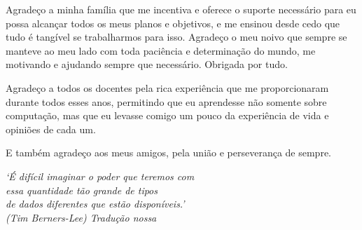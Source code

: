 \documentclass[
	12pt,				%
	openright,			%
	twoside,			%
	a4paper,			%
	english,			%
	french,				%
	spanish,			%
	brazil				%
	]{abntex2}
\begin{document}
\begin{agradecimentos}
 Agradeço a minha família que me incentiva e oferece o suporte necessário para eu possa alcançar todos os meus planos e 
 objetivos, e me ensinou desde cedo que tudo é tangível se trabalharmos para isso. Agradeço o meu noivo que sempre se 
 manteve ao meu lado com toda paciência e determinação do mundo, me motivando e ajudando sempre que necessário. Obrigada 
 por tudo.

Agradeço a todos os docentes pela rica experiência que me proporcionaram durante todos esses anos, permitindo que eu aprendesse
não somente sobre computação, mas que eu levasse comigo um pouco da experiência de vida e opiniões de cada um.

E também agradeço aos meus amigos, pela união e perseverança de sempre.
\end{agradecimentos}
 
\begin{epigrafe}
    \vspace*{\fill}
	\begin{flushright}
		\textit{`É difícil imaginar o poder que teremos com \\
		essa quantidade tão grande de tipos \\
		de dados diferentes que estão disponíveis.'\\
		(Tim Berners-Lee) Tradução nossa}
	\end{flushright}
\end{epigrafe}

\end{document}

